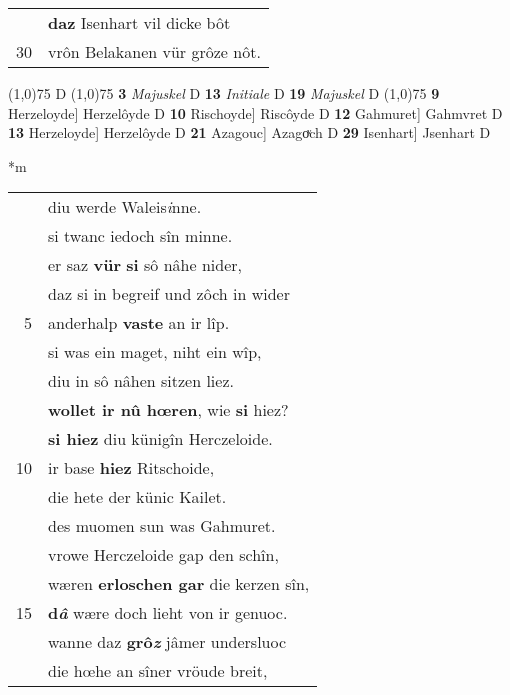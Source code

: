\documentclass[8pt,a4paper,notitlepage]{article}
\begin{document}
\begin{table}[ht]
\begin{minipage}[t]{0.5\linewidth}
\begin{tabular}{rl}
 & \textbf{daz} Isenhart vil dicke bôt\\ 
30 & vrôn Belakanen vür grôze nôt.\\ 
\end{tabular}
\scriptsize
\line(1,0){75} \newline
D \newline
\line(1,0){75} \newline
\textbf{3} \textit{Majuskel} D  \textbf{13} \textit{Initiale} D  \textbf{19} \textit{Majuskel} D  \newline
\line(1,0){75} \newline
\textbf{9} Herzeloyde] Herzelôyde D \textbf{10} Rischoyde] Riscôyde D \textbf{12} Gahmuret] Gahmvret D \textbf{13} Herzeloyde] Herzelôyde D \textbf{21} Azagouc] Azagoͮch D \textbf{29} Isenhart] Jsenhart D \newline
\end{minipage}
\hspace{0.5cm}
\begin{minipage}[t]{0.5\linewidth}
\small
\begin{center}*m
\end{center}
\begin{tabular}{rl}
 & diu werde Waleis\textit{i}nne.\\ 
 & si twanc iedoch sîn minne.\\ 
 & er saz \textbf{vür} \textbf{si} sô nâhe nider,\\ 
 & daz si in begreif und zôch in wider\\ 
5 & anderhalp \textbf{vaste} an ir lîp.\\ 
 & si was ein maget, niht ein wîp,\\ 
 & diu in sô nâhen sitzen liez.\\ 
 & \textbf{wollet ir nû hœren}, wie \textbf{si} hiez?\\ 
 & \textbf{si hiez} diu künigîn Herczeloide.\\ 
10 & ir base \textbf{hiez} Ritschoide,\\ 
 & die hete der künic Kailet.\\ 
 & des muomen sun was Gahmuret.\\ 
 & vrowe Herczeloide gap den schîn,\\ 
 & wæren \textbf{erloschen gar} die kerzen sîn,\\ 
15 & \textbf{d\textit{â}} wære doch lieht von ir genuoc.\\ 
 & wanne daz \textbf{grô\textit{z}} jâmer undersluoc\\ 
 & die hœhe an sîner vröude breit,\\ 

\end{tabular}
\end{minipage}
\end{table}
\end{document}
